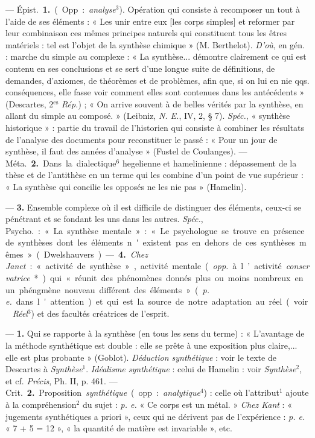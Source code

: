 \begin{itemize}[leftmargin=1cm, label=, itemsep=1pt]
 —  \si{Épist.} {\bf 1.} (Opp. :
{\it analyse}$^3$). Opération qui consiste à recomposer un tout à l’aide de
ses éléments : « Les unir entre eux [les corps simples] et reformer par leur
combinaison ces mêmes principes naturels qui constituent tous les êtres
matériels : tel est l’objet de la synthèse chimique » (M. Berthelot).
{\it D'où}, en gén. : marche du simple au complexe : « La synthèse...
démontre clairement ce qui est contenu en ses conclusions et se sert d’une
longue suite de définitions, de demandes, d’axiomes, de théorèmes et de
problèmes, afin que, si on lui en nie qqs. conséquences, elle fasse voir
comment elles sont contenues dans les antécédents » (Descartes,
2$^\text{es}$ {\it Rép.}) ; « On arrive souvent à de belles vérités par la
synthèse, en allant du simple au composé. » (Leibniz, {\it N. E.}, IV, 2, §
7). {\it Spéc.}, « synthèse historique » : partie du travail de l’historien
qui consiste à combiner les résultats de l’analyse des documents pour
reconstituer le passé : « Pour un jour de synthèse, il faut des années
d'analyse » (Fustel de Coulanges). — \si{Méta.} {\bf 2.} Dans la
dialectique$^6$ hegelienne et hamelinienne : dépassement de la thèse et de
l’antithèse en un terme qui les combine d’un point de vue supérieur : « La
synthèse qui concilie les opposés ne les nie pas » (Hamelin).

—  {\bf 3.} Ensemble complexe où il est difficile de
distinguer des éléments, ceux-ci se pénétrant et se fondant les uns dans les
autres. {\it Spéc.}, \si{Psycho.} : « La synthèse mentale » : « Le
psychologue se trouve en présence de synthèses dont les éléments n'existent
pas en dehors de ces synthèses mêmes. » (Dwelshauvers). — {\bf 4.} {\it Chez
Janet} : « activité de synthèse », activité mentale ({\it opp.} à l’activité
{\it conservatrice}*) qui « réunit des phénomènes donnés plus ou moins
nombreux en un phéngmène nouveau différent des éléments » ({\it p. e.} dans
l'attention) et qui est la source de notre adaptation au réel (voir {\it
Réel}$^3$) et des facultés créatrices de l'esprit.

 — {\bf 1.} Qui se rapporte à la synthèse (en tous les sens
du terme) : « L'avantage de la méthode synthétique est double : elle se
prête à une exposition plus claire,... elle est plus probante » (Goblot).
{\it Déduction synthétique} : voir le texte de Descartes à
{\it Synthèse}$^1$. {\it Idéalisme synthétique} : celui de Hamelin : voir
{\it Synthèse}$^2$, et cf. {\it Précis}, Ph. II, p. 461.
— \si{Crit.} {\bf 2.} Proposition {\it synthétique} (opp. :
{\it analytique}$^4$) : celle où l’attribut$^1$ ajoute à la compréhension$^2$
du sujet : {\it p. e.} « Ce corps est un métal. » {\it Chez Kant} : «
jugements synthétiques a priori », ceux qui ne dérivent pas de
l'expérience : {\it p. e.} « 7 + 5 = 12 », « la quantité de matière est
invariable », etc.


\end{itemize}
